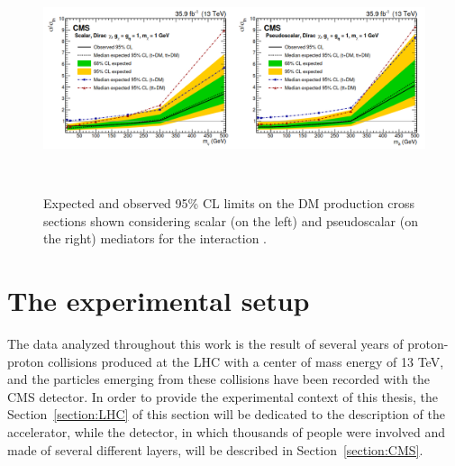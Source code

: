 \documentclass[a4paper, 10pt, openright]{report}
\begin{document}
\begin{figure}[htbp]
\begin{center}
\includegraphics[width=15.4cm, height=6.6cm]{figs/Combination2019.png}
\caption{Expected and observed 95\% \ac{CL} limits on the \ac{DM} production cross sections shown considering scalar (on the left) and pseudoscalar (on the right) mediators for the interaction \cite{PreviousSingleDoubleTopAllLep13CMS}.}
\label{figure:Combination2019}
\end{center}
\end{figure}



























\chapter{The experimental setup} \label{chapter:Device}

The data analyzed throughout this work is the result of several years of proton-proton collisions produced at the \ac{LHC} with a center of mass energy of 13 TeV, and the particles emerging from these collisions have been recorded with the \ac{CMS} detector. In order to provide the experimental context of this thesis, the Section~\ref{section:LHC} of this section will be dedicated to the description of the accelerator, while the detector, in which thousands of people were involved and made of several different layers, will be described in Section~\ref{section:CMS}.
\end{document}

